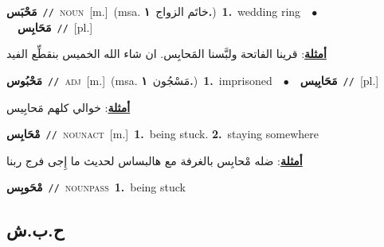 \documentclass[10pt,a4paper,twoside]{article} %
\begin{document}
\begin{multicols}{2}
{\setlength\topsep{0pt}\textbf{\foreignlanguage{arabic}{مَحْبَس}}\ {\color{gray}\texttt{//}\color{black}}\ \textsc{noun}\ [m.]\ \color{gray}(msa. \foreignlanguage{arabic}{خاتَم الزواج}~\foreignlanguage{arabic}{\textbf{١.}})\color{black}\ \textbf{1.}~wedding ring\ \ $\bullet$\ \ \setlength\topsep{0pt}\textbf{\foreignlanguage{arabic}{مَحَابِس}}\ {\color{gray}\texttt{//}\color{black}}\ [pl.]\  \begin{flushright}\color{gray}\foreignlanguage{arabic}{\textbf{\underline{\foreignlanguage{arabic}{أمثلة}}}: قرينا الفاتحة ولبَّسنا المَحابِس. ان شاء الله الخميس بنقطِّع الفيد}\end{flushright}\color{black}} \vspace{2mm}

{\setlength\topsep{0pt}\textbf{\foreignlanguage{arabic}{مَحْبُوس}}\ {\color{gray}\texttt{//}\color{black}}\ \textsc{adj}\ [m.]\ \color{gray}(msa. \foreignlanguage{arabic}{مَسْجُون}~\foreignlanguage{arabic}{\textbf{١.}})\color{black}\ \textbf{1.}~imprisoned\ \ $\bullet$\ \ \setlength\topsep{0pt}\textbf{\foreignlanguage{arabic}{مَحَابِيس}}\ {\color{gray}\texttt{//}\color{black}}\ [pl.]\  \begin{flushright}\color{gray}\foreignlanguage{arabic}{\textbf{\underline{\foreignlanguage{arabic}{أمثلة}}}: خوالي كلهم مَحابِيس}\end{flushright}\color{black}} \vspace{2mm}

{\setlength\topsep{0pt}\textbf{\foreignlanguage{arabic}{مْحَابِس}}\ {\color{gray}\texttt{//}\color{black}}\ \textsc{noun\textunderscore act}\ [m.]\ \textbf{1.}~being stuck.  \textbf{2.}~staying somewhere\  \begin{flushright}\color{gray}\foreignlanguage{arabic}{\textbf{\underline{\foreignlanguage{arabic}{أمثلة}}}: ضله مْحابِس بالغرفة مع هالبساس لحديث ما إِجى فرج ربنا}\end{flushright}\color{black}} \vspace{2mm}

{\setlength\topsep{0pt}\textbf{\foreignlanguage{arabic}{مْحَوبِس}}\ {\color{gray}\texttt{//}\color{black}}\ \textsc{noun\textunderscore pass}\ \textbf{1.}~being stuck\ } \vspace{2mm}

\vspace{-3mm}
\subsection*{\color{blue}\foreignlanguage{arabic}{ح.ب.ش}\color{blue}{}} 


\end{multicols}
\end{document}
